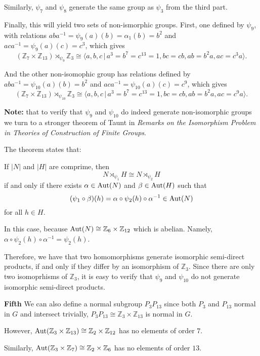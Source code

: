 \documentclass[12pt]{Qual}
\begin{document}
\begin{solution}
\begin{enumerate}[label=(\alph*)]
    Similarly, $\psi_7$ and $\psi_8$ generate the same group as $\psi_3$ from the third part.

    Finally, this will yield two sets of non-ismorphic groups. First, one defined by $\psi_9$, with relations $aba^{-1}=\psi_9(a)(b)=\alpha_1(b)=b^2$ and $aca^{-1}=\psi_9(a)(c)=c^3$, which gives $$(\mathbb{Z}_7\times \mathbb{Z}_{13})\rtimes_{\psi_9}\mathbb{Z}_3\cong\langle a,b,c\,|\, a^3=b^7=c^{13}=1, bc=cb, ab=b^2a, ac=c^3a\rangle.$$

    And the other non-isomophic group has relations defined by $aba^{-1}=\psi_{10}(a)(b)=b^2$ and $aca^{-1}=\psi_{10}(a)(c)=c^9$, which gives $$(\mathbb{Z}_7\times \mathbb{Z}_{13})\rtimes_{\psi_{10}}\mathbb{Z}_3\cong\langle a,b,c\,|\, a^3=b^7=c^{13}=1, bc=cb, ab=b^2a, ac=c^9a\rangle.$$

    \textbf{Note:} that to verify that $\psi_9$ and $\psi_{10}$ do indeed generate non-isomorphic groups we turn to a stronger theorem of Taunt in \textit{Remarks on the Isomorphism Problem in Theories of Construction of Finite Groups}.

    The theorem states that:
    \begin{framed}
    If $|N|$ and $|H|$ are comprime, then $$N\rtimes_{\psi_1} H\cong N\rtimes_{\psi_2} H$$ if and only if there exists $\alpha\in\text{Aut}(N)$ and $\beta\in \text{Aut}(H)$ such that $$(\psi_1\circ\beta)(h)=\alpha\circ\psi_2(h)\circ\alpha^{-1}\in\text{Aut}(N)$$ for all $h\in H$.
    \end{framed}

    In this case, because $\text{Aut}(N)\cong \mathbb{Z}_6\times\mathbb{Z}_{12}$ which is abelian. Namely, $\alpha\circ\psi_2(h)\circ\alpha^{-1}=\psi_2(h)$.

    Therefore, we have that two homomorphisms generate isomorphic semi-direct products, if and only if they differ by an isomorphism of $\mathbb{Z}_3$. Since there are only two isomoprhisms of $\mathbb{Z}_3$, it is easy to verify that $\psi_9$ and $\psi_{10}$ do not generate isomorphic semi-direct products.


    \textbf{Fifth} We can also define a normal subgroup $P_3P_{13}$ since both $P_3$ and $P_{13}$ normal in $G$ and intersect trivially, $P_3P_{13}\cong\mathbb{Z}_3\times\mathbb{Z}_{13}$ is normal in $G$.

    However, $\text{Aut}(\mathbb{Z}_3\times\mathbb{Z}_{13})\cong\mathbb{Z}_2\times\mathbb{Z}_{12}$ has no elements of order $7$.

    Similarly, $\text{Aut}(\mathbb{Z}_3\times\mathbb{Z}_7)\cong\mathbb{Z}_2\times\mathbb{Z}_6$ has no elements of order $13$.


\end{enumerate}
\end{solution}
\end{document}

